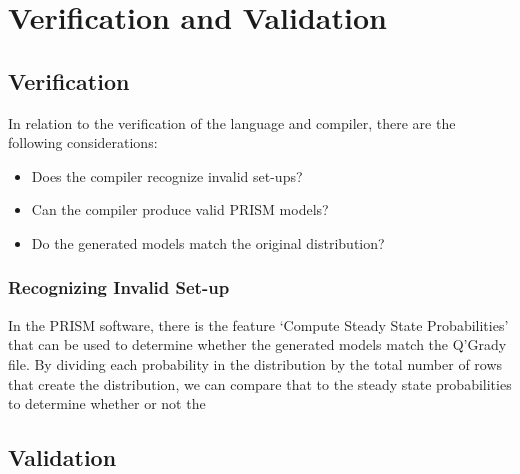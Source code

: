 \documentclass[report.tex]{subfiles}
\begin{document}
\chapter{Verification and Validation} %
\label{cha:verification_and_validation}
\section{Verification} %
\label{sec:verification}
In relation to the verification of the language and compiler, there are the
following considerations:
\begin{itemize}
    \item Does the compiler recognize invalid set-ups?
    \item Can the compiler produce valid PRISM models?
    \item Do the generated models match the original distribution?
\end{itemize}

\subsection{Recognizing Invalid Set-up} %
\label{sub:recognizing_invalid_set_up}


In the PRISM software, there is the feature `Compute Steady State Probabilities'
that can be used to determine whether the generated models match the Q'Grady
file. By dividing each probability in the distribution by the total number of
rows that create the distribution, we can compare that to the steady state
probabilities to determine whether or not the 

\section{Validation} %
\label{sec:validation}

\newpage
\end{document}
